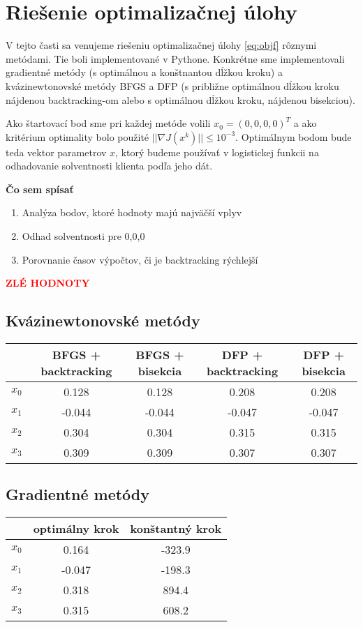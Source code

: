 \documentclass[report.tex]{subfiles}
\begin{document}
   

\section{Riešenie optimalizačnej úlohy}\label{sec:CD}

V tejto časti sa venujeme riešeniu optimalizačnej úlohy \ref{eq:objf} rôznymi metódami. Tie boli implementované v Pythone. Konkrétne sme implementovali gradientné metódy (s optimálnou a konštnantou dĺžkou kroku) a kvázinewtonovské metódy BFGS a DFP (s približne optimálnou dĺžkou kroku nájdenou backtracking-om alebo s optimálnou dĺžkou kroku, nájdenou bisekciou). 

Ako štartovací bod sme pri každej metóde volili $x_0 = (0,0,0,0)^T$ a ako kritérium optimality bolo použité $||\nabla J(x^k)|| \leq 10^{-3}$. Optimálnym bodom bude teda vektor parametrov $x$, ktorý budeme používať v logistickej funkcii na odhadovanie solventnosti klienta podľa jeho dát.
	
\textbf{Čo sem spísať}
\begin{enumerate}
	\item Analýza bodov, ktoré hodnoty majú najväčší vplyv
	\item Odhad solventnosti pre 0,0,0
	\item Porovnanie časov výpočtov, či je backtracking rýchlejší
\end{enumerate}

\textcolor{red}{\textbf{\Large{ZLÉ  HODNOTY}}}

\subsection{Kvázinewtonovské metódy}
\begin{center}
	\small
	\begin{tabular}{| c | c  c  c  c |}
		\hline
		 & BFGS + backtracking & BFGS + bisekcia & DFP + backtracking & DFP + bisekcia \\
		\hline
		$x_0$ & 0.128 & 0.128 & 0.208 & 0.208 \\
		$x_1$ & -0.044 & -0.044 & -0.047 & -0.047 \\
		$x_2$ & 0.304 &  0.304 & 0.315 & 0.315 \\
		$x_3$ & 0.309 & 0.309 & 0.307 & 0.307 \\
		\hline
	\end{tabular}
\end{center}

\subsection{Gradientné metódy}

\begin{center}
	\small
	\begin{tabular}{| c | c  c |}
		\hline
		& optimálny krok & konštantný krok \\
		\hline
		$x_0$ & 0.164 & -323.9  \\
		$x_1$ & -0.047 & -198.3  \\
		$x_2$ & 0.318 &  894.4  \\
		$x_3$ & 0.315 & 608.2  \\
		\hline
	\end{tabular}
\end{center}
\end{document}
